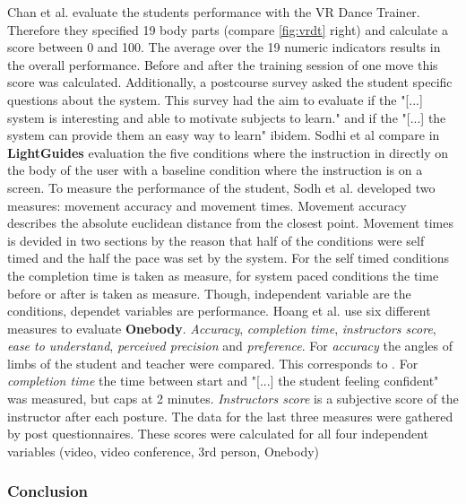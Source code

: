 Chan et al. evaluate the students performance with the VR Dance Trainer. Therefore they specified 19 body parts (compare \ref{fig:vrdt} right) and calculate a score between 0 and 100. The average over the 19 numeric indicators results in the overall performance. Before and after the training session of one move this score was calculated. Additionally, a postcourse survey asked the student specific questions about the system. This survey had the aim to evaluate if the "[...] system is interesting and able to motivate subjects to learn." \cite{Chan2011} and if the "[...] the system can provide them an easy way to learn" ibidem.
Sodhi et al \cite{Sodhi2012} compare in \textbf{LightGuides} evaluation the five conditions where the instruction in directly on the body of the user with a baseline condition where the instruction is on a screen. To measure the performance of the student, Sodh et al. developed two measures: movement accuracy and movement times. Movement accuracy describes the absolute euclidean distance from the closest point. Movement times is devided in two sections by the reason that half of the conditions were self timed and the half the pace was set by the system. For the self timed conditions the completion time is taken as measure, for system paced conditions the time before or after is taken as measure. Though, independent variable are the conditions, dependet variables are performance.
Hoang et al. \cite{Hoang2016} use six different measures to evaluate \textbf{Onebody}. \textit{Accuracy}, \textit{completion time}, \textit{instructors score}, \textit{ease to understand}, \textit{perceived precision} and \textit{preference}. For \textit{accuracy} the angles of limbs of the student and teacher were compared. This corresponds to \todo. For \textit{completion time} the time between start and "[...] the student feeling confident" was measured, but caps at 2 minutes. \textit{Instructors score} is a subjective score of the instructor after each posture. The data for the last three measures were gathered by post questionnaires. These scores were calculated for all four independent variables (video, video conference, 3rd person, Onebody)

\subsubsection{Conclusion}


